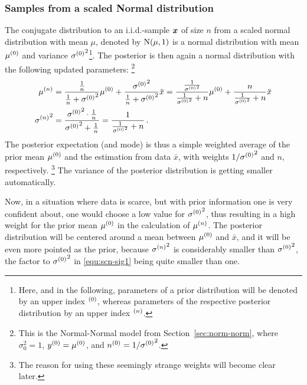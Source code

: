 \subsubsection{Samples from a scaled Normal distribution} %
\label{sec:ex-scn}
The conjugate distribution to an i.i.d.-sample ${\bm x}$ of
size $n$ from a scaled normal distribution with mean $\mu$, denoted
by $\operatorname{N}(\mu,1)$ %
is a normal distribution with mean $\mu^{(0)}$ and variance ${\sigma^{(0)}}^2$\footnote{Here, and in the
following, parameters of a prior distribution will be denoted by an upper index ${}^{(0)}$, whereas
parameters of the respective posterior distribution by an upper index ${}^{(n)}$.}.
The posterior is then again a normal distribution with the following updated parameters:%
\footnote{This is the Normal-Normal model from Section~\ref{sec:norm-norm}, where
$\sigma_0^2 = 1$, $y^{(0)} = \mu^{(0)}$, and $n^{(0)} = 1/{\sigma^{(0)}}^2$.}
\begin{align}
\mu^{(n)} &=  \frac{ \frac{1}{n}   }{ \frac{1}{n} + {\sigma^{(0)}}^2 } \mu^{(0)}
          +\frac{ {\sigma^{(0)}}^2 }{ \frac{1}{n} + {\sigma^{(0)}}^2 } \bar{x}
        =  \frac{ \frac{1}{{\sigma^{(0)}}^2} }{ \frac{1}{{\sigma^{(0)}}^2} + n } \mu^{(0)}
          +\frac{ n }                      { \frac{1}{{\sigma^{(0)}}^2} + n } \bar{x} \label{equ:scn-mu1}\\
{\sigma^{(n)}}^2 &= \frac{ {\sigma^{(0)}}^2 \cdot \frac{1}{n} }{ {\sigma^{(0)}}^2 + \frac{1}{n} }
               = \frac{1}{ \frac{1}{{\sigma^{(0)}}^2} + n }\,. \label{equ:scn-sig1}
\end{align}
The posterior expectation (and mode) is thus a simple weighted average of the prior mean
$\mu^{(0)}$ and the estimation from data $\bar{x}$, with weights
$1/{\sigma^{(0)}}^2$ and $n$, respectively.%
\footnote{The reason for using these seemingly strange weights will become clear later.}
The variance of the posterior distribution is getting smaller automatically.

Now, in a situation where data is scarce, but with prior information one is very confident about,
one would choose a low value for ${\sigma^{(0)}}^2$, thus resulting in a high weight
for the prior mean $\mu^{(0)}$ in the calculation of $\mu^{(n)}$.
The posterior distribution will be centered around a mean between $\mu^{(0)}$
and $\bar{x}$, and it will be even more pointed as the prior, because
${\sigma^{(n)}}^2$ is considerably smaller than ${\sigma^{(0)}}^2$, the factor to
${\sigma^{(0)}}^2$ in \eqref{equ:scn-sig1} being quite smaller than one.

